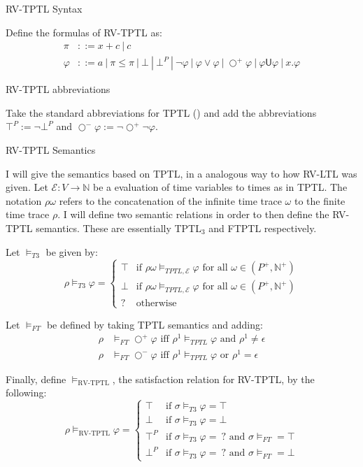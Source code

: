 \documentclass[a4paper]{article}
\newcommand{\U}{\mathsf{U}}
\newcommand{\tand}{\text{ and }}
\newcommand{\tor}{\text{ or }}
\newcommand{\tiff}{\text{ iff }}
\newcommand{\fall}{\text{ for all }}
\newcommand{\sn}{\bigcirc^+}
\newcommand{\wn}{\bigcirc^-}
\newcommand{\eval}{\mathcal{E}}
\begin{document}
\begin{defn}{RV-TPTL Syntax}

  Define the formulas of RV-TPTL as:
  \begin{align*}
    \pi &::= x + c ~|~ c\\
    \varphi &::= a ~|~ \pi \leq \pi ~|~ \bot ~|~ \bot^P ~|~ \neg \varphi ~|~\varphi \lor \varphi ~|~ \sn \varphi ~|~ \varphi \U \varphi ~|~ x. \varphi
  \end{align*}
\end{defn}
\begin{notn}{RV-TPTL abbreviations}

  Take the standard abbreviations for TPTL () and add the abbreviations \(\top^P := \neg \bot^P\) and $\wn \varphi:= \neg \sn \neg \varphi$.
\end{notn}
\begin{defn}{RV-TPTL Semantics}\label{rvtptlsem}

  I will give the semantics based on TPTL, in a analogous way to how RV-LTL was given.
  Let $\eval:V\to\mathbb{N}$ be a evaluation of time variables to times as in TPTL.
  The notation $\rho\omega$ refers to the concatenation of the infinite time trace $\omega$ to the finite time trace $\rho$.
  I will define two semantic relations in order to then define the RV-TPTL semantics. These are essentially TPTL$_3$ and FTPTL respectively.

  Let $\vDash_{T3}$ be given by:
  \[\rho\vDash_{T3}\varphi = \begin{cases}
      \top & \text{if } \rho\omega \vDash_{TPTL,\eval} \varphi \fall \omega \in (P^+,\mathbb{N}^+)\\
      \bot & \text{if }  \rho\omega \vDash_{TPTL,\eval} \varphi \fall \omega \in (P^+,\mathbb{N}^+)\\
      ? & \text{otherwise}
    \end{cases}
  \]

  Let $\vDash_{FT}$ be defined by taking TPTL semantics and adding:
  \begin{align*}\label{ftsem}
    \rho&\vDash_{FT}\sn\varphi \tiff \rho^1\vDash_{TPTL}\varphi \tand \rho^1 \neq \epsilon\\
    \rho&\vDash_{FT}\wn\varphi \tiff \rho^1\vDash_{TPTL}\varphi \tor \rho^1 = \epsilon
  \end{align*}

  Finally, define $\vDash_{\text{RV-TPTL}}$, the satisfaction relation for RV-TPTL, by the following:
  \[\rho\vDash_{\text{RV-TPTL}}\varphi =
    \begin{cases}
      \top & \text{if } \sigma \vDash_{T3} \varphi = \top\\
      \bot & \text{if } \sigma \vDash_{T3} \varphi = \bot\\
      \top^P & \text{if } \sigma \vDash_{T3} \varphi = ~?\tand \sigma\vDash_{FT} = \top \\
      \bot^P & \text{if } \sigma \vDash_{T3} \varphi = ~?\tand \sigma\vDash_{FT} = \bot
    \end{cases}
  \]
\end{defn}
\end{document}
